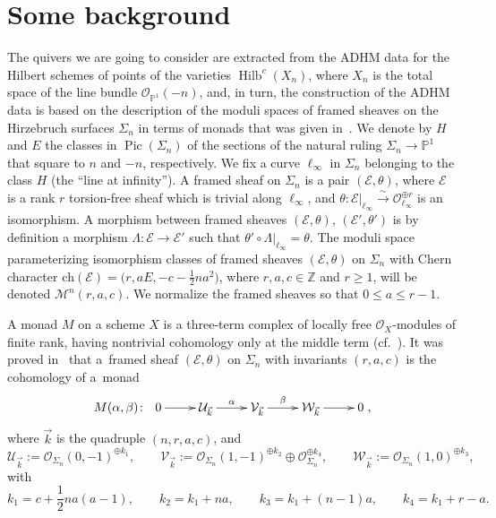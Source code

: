 \documentclass[pdftex]{sigma}
\numberwithin{equation}{section}
\begin{document}
\section{Some background } \label{background}
The quivers we are going to consider are extracted from the ADHM data for the Hilbert schemes of points of the varieties $\operatorname{Hilb}^c(X_n)$,
 where $X_n$ is the total space of the line bundle $\mathcal{O}_{\mathbb{P}^1}(-n)$,
and, in turn,
the construction of the ADHM data is based on the description of the moduli spaces of framed sheaves on the Hirzebruch surfaces $\Sigma_n$ in terms of monads that was given in~\cite{bbr}.
We denote by $H$ and $E$ the classes in $\operatorname{Pic}(\Sigma_n)$ of the sections
of the natural ruling $\Sigma_n\to\mathbb{P}^1$ that square to
$n$ and $-n$, respectively.
We fix a curve $\ell_{\infty}$ in $\Sigma_n$ belonging to the class $H$ (the ``line at infinity'').
A framed sheaf on $\Sigma_n$ is a pair $(\mathcal{E}, \theta)$, where $\mathcal{E}$ is a rank $r$ torsion-free sheaf which
is trivial along $\ell_{\infty}$, and $\theta \colon \mathcal{E}\vert_{\ell_{\infty}}\stackrel{\sim}{\to}\mathcal{O}_{\ell_{\infty}}^{\oplus r}$ is an isomorphism. A morphism between framed sheaves $(\mathcal{E}, \theta)$, $(\mathcal{E}', \theta')$ is by definition a morphism $\Lambda\colon \mathcal{E} \longrightarrow \mathcal{E}'$ such that
$\theta'\circ\Lambda\vert_{\ell_{\infty}} = \theta$. The moduli space parameterizing isomorphism classes of framed sheaves $(\mathcal{E}, \theta)$ on $\Sigma_n$ with Chern character $\textrm{ch}(\mathcal{E}) = \big(r, aE, -c -\frac{1}{2} na^2\big)$, where $r, a, c \in \mathbb{Z}$ and $r\geq 1$, will be denoted $\mathcal{M}^{n}(r,a,c)$. We normalize the framed sheaves so that $0\leq a\leq r-1$.

A monad $M$ on a scheme $X$ is a three-term complex of locally free $\mathcal O_X$-modules of finite rank, having nontrivial cohomology only at the middle term (cf.~\cite[Definition~II.3.1.1]{Ok}).
It was proved in~\cite{bbr} that a~framed sheaf
$(\mathcal{E}, \theta)$ on $\Sigma_n$ with invariants $(r,a,c)$ is the cohomology of a~monad
\begin{equation}
M(\alpha,\beta)\colon \ \xymatrix{0 \ar[r] & \mathcal{U}_{\vec{k}} \ar[r]^-{\alpha} & \mathcal{V}_{\vec{k}} \ar[r]^-{\beta} & \mathcal{W}_{\vec{k}} \ar[r] & 0
} , \label{fundamentalmonad}
\end{equation}
where $\vec{k}$ is the quadruple $ (n,r,a,c)$, and
\begin{equation*}
\mathcal{U}_{\vec{k}}:=\mathcal{O}_{\Sigma_n}(0,-1)^{\oplus k_1},\qquad
\mathcal{V}_{\vec{k}}:=\mathcal{O}_{\Sigma_n}(1,-1)^{\oplus k_2} \oplus \mathcal{O}_{\Sigma_n}^{\oplus k_4},\qquad
\mathcal{W}_{\vec{k}}:=\mathcal{O}_{\Sigma_n}(1,0)^{\oplus k_3} ,
\end{equation*}
with
\begin{equation*}
 k_1=c+\dfrac{1}{2}na(a-1),\qquad
k_2=k_1+na,\qquad
k_3=k_1+(n-1)a,\qquad
k_4=k_1+r-a .
\end{equation*}
\end{document}
